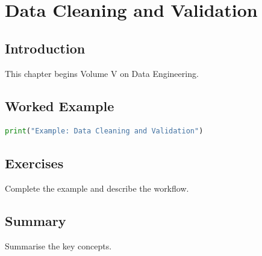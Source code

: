 \chapter{Data Cleaning and Validation}
\label{chap:vol5-4}



\section{Introduction}
This chapter begins Volume V on Data Engineering.

\section{Worked Example}
\begin{lstlisting}[language=Python]
print("Example: Data Cleaning and Validation")
\end{lstlisting}

\section{Exercises}
\begin{exercise}
Complete the example and describe the workflow.
\end{exercise}

\section{Summary}
Summarise the key concepts.
